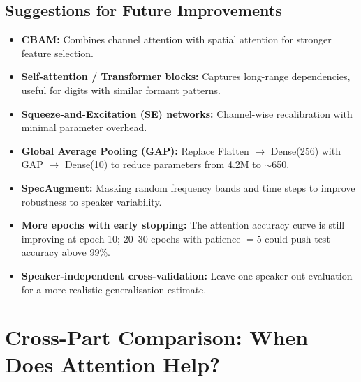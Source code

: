 \documentclass[12pt,a4paper]{article}
\begin{document}
\subsection{Suggestions for Future Improvements}

\begin{itemize}[leftmargin=1.5em]
    \item \textbf{CBAM:} Combines channel attention with spatial attention for
          stronger feature selection.
    \item \textbf{Self-attention / Transformer blocks:} Captures long-range
          dependencies, useful for digits with similar formant patterns.
    \item \textbf{Squeeze-and-Excitation (SE) networks:} Channel-wise recalibration
          with minimal parameter overhead.
    \item \textbf{Global Average Pooling (GAP):} Replace Flatten $\to$ Dense(256)
          with GAP $\to$ Dense(10) to reduce parameters from 4.2M to $\sim$650.
    \item \textbf{SpecAugment:} Masking random frequency bands and time steps to
          improve robustness to speaker variability.
    \item \textbf{More epochs with early stopping:} The attention accuracy curve
          is still improving at epoch 10; 20--30 epochs with patience $= 5$ could
          push test accuracy above 99\%.
    \item \textbf{Speaker-independent cross-validation:} Leave-one-speaker-out
          evaluation for a more realistic generalisation estimate.
\end{itemize}

\section{Cross-Part Comparison: When Does Attention Help?}
\end{document}
